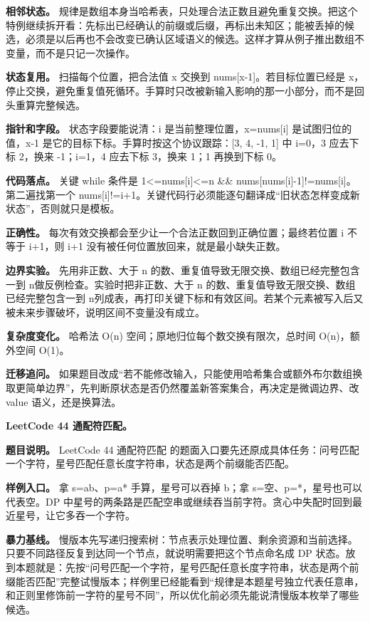 \textbf{相邻状态。} 规律是数组本身当哈希表，只处理合法正数且避免重复交换。把这个特例继续拆开看：先标出已经确认的前缀或后缀，再标出未知区；能被丢掉的候选，必须是以后再也不会改变已确认区域语义的候选。这样才算从例子推出数组不变量，而不是只记一次操作。

\textbf{状态复用。} 扫描每个位置，把合法值 x 交换到 nums[x-1]。若目标位置已经是 x，停止交换，避免重复值死循环。手算时只改被新输入影响的那一小部分，而不是回头重算完整候选。

\textbf{指针和字段。} 状态字段要能说清：i 是当前整理位置，x=nums[i] 是试图归位的值，x-1 是它的目标下标。手算时按这个协议跟踪：[3, 4, -1, 1] 中 i=0，3 应去下标 2，换来 -1；i=1，4 应去下标 3，换来 1；1 再换到下标 0。

\textbf{代码落点。} 关键 while 条件是 1<=nums[i]<=n \&\& nums[nums[i]-1]!=nums[i]。第二遍找第一个 nums[i]!=i+1。关键代码行必须能逐句翻译成“旧状态怎样变成新状态”，否则就只是模板。

\textbf{正确性。} 每次有效交换都会至少让一个合法正数回到正确位置；最终若位置 i 不等于 i+1，则 i+1 没有被任何位置放回来，就是最小缺失正数。

\textbf{边界实验。} 先用非正数、大于 n 的数、重复值导致无限交换、数组已经完整包含一到 n做反例检查。实验时把非正数、大于 n 的数、重复值导致无限交换、数组已经完整包含一到 n列成表，再打印关键下标和有效区间。若某个元素被写入后又被未来步骤破坏，说明区间不变量没有成立。

\textbf{复杂度变化。} 哈希法 O(n) 空间；原地归位每个数交换有限次，总时间 O(n)，额外空间 O(1)。

\textbf{迁移追问。} 如果题目改成“若不能修改输入，只能使用哈希集合或额外布尔数组换取更简单边界”，先判断原状态是否仍然覆盖新答案集合，再决定是微调边界、改 value 语义，还是换算法。

\noindent\textbf{LeetCode 44 通配符匹配。}

\textbf{题目说明。} LeetCode 44 通配符匹配 的题面入口要先还原成具体任务：问号匹配一个字符，星号匹配任意长度字符串，状态是两个前缀能否匹配。

\textbf{样例入口。} 拿 s=ab、p=a* 手算，星号可以吞掉 b；拿 s=空、p=*，星号也可以代表空。DP 中星号的两条路是匹配空串或继续吞当前字符。贪心中失配时回到最近星号，让它多吞一个字符。

\textbf{暴力基线。} 慢版本先写递归搜索树：节点表示处理位置、剩余资源和当前选择。只要不同路径反复到达同一个节点，就说明需要把这个节点命名成 DP 状态。放到本题就是：先按“问号匹配一个字符，星号匹配任意长度字符串，状态是两个前缀能否匹配”完整试慢版本；样例里已经能看到“规律是本题星号独立代表任意串，和正则里修饰前一字符的星号不同”，所以优化前必须先能说清慢版本枚举了哪些候选。

